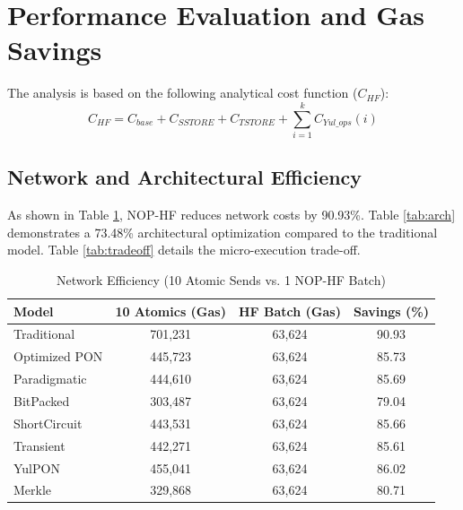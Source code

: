 \documentclass[conference]{IEEEtran}
\begin{document}
\section{Performance Evaluation and Gas Savings}
The analysis is based on the following analytical cost function ($C_{HF}$):
\begin{equation}
C_{HF} = C_{base} + C_{SSTORE} + C_{TSTORE} + \sum_{i=1}^{k} C_{Yul\_ops}(i)
\end{equation}


\subsection{Network and Architectural Efficiency}

As shown in Table \ref{tab:network}, NOP-HF reduces network costs by 90.93\%. Table \ref{tab:arch} demonstrates a 73.48\% architectural optimization compared to the traditional model. Table \ref{tab:tradeoff} details the micro-execution trade-off.


\begin{table}[htbp]
\caption{Network Efficiency (10 Atomic Sends vs. 1 NOP-HF Batch)}
\begin{center}
\begin{tabular}{|l|c|c|c|}
\hline
\textbf{Model} & \textbf{10 Atomics (Gas)} & \textbf{HF Batch (Gas)} & \textbf{Savings (\%)} \\
\hline
Traditional   & 701,231 & 63,624 & 90.93 \\
Optimized PON & 445,723 & 63,624 & 85.73 \\
Paradigmatic  & 444,610 & 63,624 & 85.69 \\
BitPacked     & 303,487 & 63,624 & 79.04 \\
ShortCircuit  & 443,531 & 63,624 & 85.66 \\
Transient     & 442,271 & 63,624 & 85.61 \\
YulPON        & 455,041 & 63,624 & 86.02 \\
Merkle        & 329,868 & 63,624 & 80.71 \\
\hline
\end{tabular}
\label{tab:network}
\end{center}
\end{table}
\end{document}

